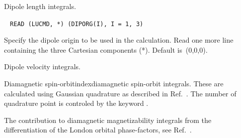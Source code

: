 \begin{description}
\item[] Dipole length integrals.


\item[]\verb| |\newline
\verb|READ (LUCMD, *) (DIPORG(I), I = 1, 3)|

Specify the dipole origin to be used in the
calculation. Read one more
line containing the three Cartesian components (*). Default is~(0,0,0).

\item[] Dipole velocity integrals.


\item[] Diamagnetic spin-orbitindex{diamagnetic spin-orbit}
integrals. These are
calculated using Gaussian quadrature as
described in
Ref.~\cite{dmtajcp73}. The number of quadrature point is controled by
the keyword .


\item[] The contribution to diamagnetic
magnetizability
integrals from the differentiation of the London orbital
phase-factors, see Ref.~\cite{thpjjcp95}.


\end{description}
